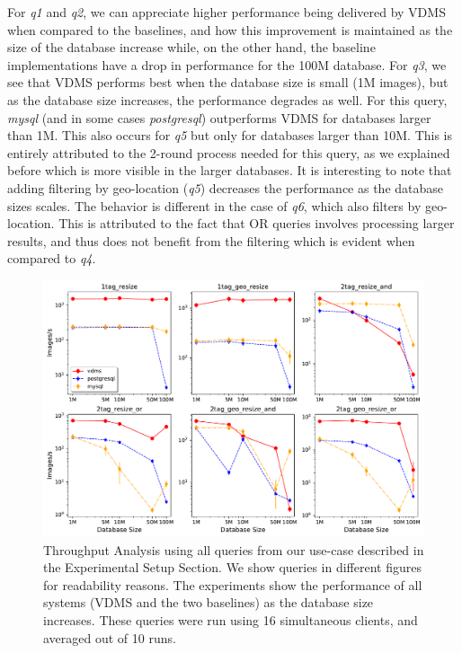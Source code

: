 For \textit{q1} and \textit{q2}, we can appreciate higher performance being delivered by
VDMS when compared to the baselines, and how this improvement is maintained
as the size of the database increase while,
on the other hand, the baseline implementations have a drop in performance
for the 100M database.
For \textit{q3}, we see that VDMS performs best when the database size
is small (1M images), but as the database size increases,
the performance degrades as well.
For this query, \textit{mysql} (and in some cases \textit{postgresql}) outperforms VDMS
for databases larger than 1M.
This also occurs for \textit{q5} but only for databases larger than 10M.
This is entirely attributed to the 2-round process needed for this query,
as we explained before which is more visible in the larger databases.
It is interesting to note that adding filtering by geo-location
(\textit{q5}) decreases the performance as the database sizes scales.
The behavior is different in the case of \textit{q6},
which also filters by geo-location.
This is attributed to the fact that OR queries involves processing
larger results, and thus does not benefit from the filtering
which is evident when compared to \textit{q4}.

\begin{figure}[ht!]
\includegraphics[width=\columnwidth]{figures/plot_th_16_mosaic_results_throughput}
\caption{Throughput Analysis using all queries from our use-case
described in the Experimental Setup Section.
We show queries in different figures for readability reasons.
The experiments show the performance of all systems (VDMS and the two baselines) as the
database size increases.
These queries were run using 16 simultaneous clients, and averaged out of 10 runs.}
\label{fig:q_throughput_16}
\end{figure}

